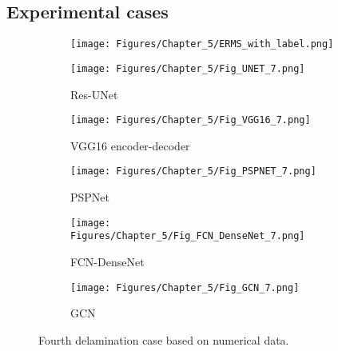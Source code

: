 \subsection{Experimental cases}
\label{sec522}
\begin{figure} [!h]
	\centering
	\begin{subfigure}[b]{.48\textwidth}
		\centering
		\texttt{[image: Figures/Chapter\_5/ERMS\_with\_label.png]}
		\caption{}
		\label{fig:ERMS_with_label}
	\end{subfigure}
	\hfill
	\begin{subfigure}[b]{.48\textwidth}
		\centering
		\texttt{[image: Figures/Chapter\_5/Fig\_UNET\_7.png]}
		\caption{Res-UNet}
		\label{fig:unet_exp_erms}	
	\end{subfigure}
	\hfill
	\begin{subfigure}[b]{.48\textwidth}
		\centering
		\texttt{[image: Figures/Chapter\_5/Fig\_VGG16\_7.png]}
		\caption{VGG16 encoder-decoder}
		\label{fig:vgg16_exp_erms}
	\end{subfigure}
	\hfill
	\begin{subfigure}[b]{.48\textwidth}
		\centering
		\texttt{[image: Figures/Chapter\_5/Fig\_PSPNET\_7.png]}
		\caption{PSPNet}
		\label{fig:pspnet_exp_erms}	
	\end{subfigure}
	\hfill
	\begin{subfigure}[b]{.48\textwidth}
		\centering
		\texttt{[image: Figures/Chapter\_5/Fig\_FCN\_DenseNet\_7.png]}
		\caption{FCN-DenseNet}
		\label{fig:densenet_exp_erms}
	\end{subfigure}
	\hfill
	\begin{subfigure}[b]{.48\textwidth}
		\centering
		\texttt{[image: Figures/Chapter\_5/Fig\_GCN\_7.png]}
		\caption{GCN}
		\label{fig:gcn_exp_erms}	
	\end{subfigure}
	\caption{Fourth delamination case based on numerical data.}
	\label{fig:exp_erms__case}
\end{figure}
\clearpage

